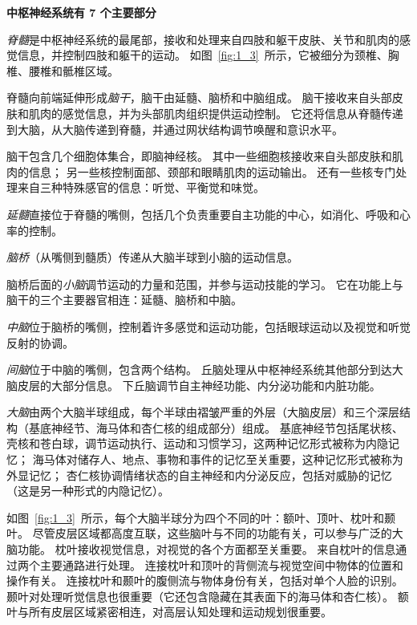 \begin{proposition}[中枢神经系统的解剖学组织] \label{box:1_2}
	\textbf{中枢神经系统有 7 个主要部分}
	
	\quad \quad \textit{脊髓}是中枢神经系统的最尾部，接收和处理来自四肢和躯干皮肤、关节和肌肉的感觉信息，并控制四肢和躯干的运动。
	如图~\ref{fig:1_3}~所示，它被细分为颈椎、胸椎、腰椎和骶椎区域。
	
	\quad \quad 脊髓向前端延伸形成\textit{脑干}，脑干由延髓、脑桥和中脑组成。
	脑干接收来自头部皮肤和肌肉的感觉信息，并为头部肌肉组织提供运动控制。
	它还将信息从脊髓传递到大脑，从大脑传递到脊髓，并通过网状结构调节唤醒和意识水平。
	
	\quad \quad 脑干包含几个细胞体集合，即脑神经核。
	其中一些细胞核接收来自头部皮肤和肌肉的信息；
	另一些核控制面部、颈部和眼睛肌肉的运动输出。
	还有一些核专门处理来自三种特殊感官的信息：听觉、平衡觉和味觉。
	
	\quad \quad \textit{延髓}直接位于脊髓的嘴侧，包括几个负责重要自主功能的中心，如消化、呼吸和心率的控制。
	
	\quad \quad \textit{脑桥}（从嘴侧到髓质）传递从大脑半球到小脑的运动信息。
	
	\quad \quad 脑桥后面的\textit{小脑}调节运动的力量和范围，并参与运动技能的学习。
	它在功能上与脑干的三个主要器官相连：延髓、脑桥和中脑。
	
	\quad \quad \textit{中脑}位于脑桥的嘴侧，控制着许多感觉和运动功能，包括眼球运动以及视觉和听觉反射的协调。
	
	\quad \quad \textit{间脑}位于中脑的嘴侧，包含两个结构。
	丘脑处理从中枢神经系统其他部分到达大脑皮层的大部分信息。
	下丘脑调节自主神经功能、内分泌功能和内脏功能。
	
	\quad \quad \textit{大脑}由两个大脑半球组成，每个半球由褶皱严重的外层（大脑皮层）和三个深层结构（基底神经节、海马体和杏仁核的组成部分）组成。
	基底神经节包括尾状核、壳核和苍白球，调节运动执行、运动和习惯学习，这两种记忆形式被称为内隐记忆；
	海马体对储存人、地点、事物和事件的记忆至关重要，这种记忆形式被称为外显记忆；
	杏仁核协调情绪状态的自主神经和内分泌反应，包括对威胁的记忆（这是另一种形式的内隐记忆）。
	
	\quad \quad 如图~\ref{fig:1_3}~所示，每个大脑半球分为四个不同的叶：额叶、顶叶、枕叶和颞叶。
	尽管皮层区域都高度互联，这些脑叶与不同的功能有关，可以参与广泛的大脑功能。
	枕叶接收视觉信息，对视觉的各个方面都至关重要。
	来自枕叶的信息通过两个主要通路进行处理。
	连接枕叶和顶叶的背侧流与视觉空间中物体的位置和操作有关。
	连接枕叶和颞叶的腹侧流与物体身份有关，包括对单个人脸的识别。
	颞叶对处理听觉信息也很重要（它还包含隐藏在其表面下的海马体和杏仁核）。
	额叶与所有皮层区域紧密相连，对高层认知处理和运动规划很重要。
	

\end{proposition}
